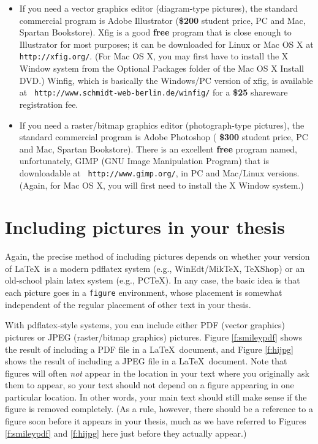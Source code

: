 \documentclass[modernstyle,12pt]{sjsuthesis}
\theoremstyle{definition}
\begin{document}
\begin{itemize}
\item If you need a vector graphics editor (diagram-type pictures),
  the standard commercial program is Adobe Illustrator ({\bf \$200\/}
  student price, PC and Mac, Spartan Bookstore).  Xfig is a good {\bf
    free\/} program that is close enough to Illustrator for most
  purposes; it can be downloaded for Linux or Mac OS X at {\tt
    http://xfig.org/}.  (For Mac OS X, you may first have to install
  the X Window system from the Optional Packages folder of the Mac OS
  X Install DVD.)  Winfig, which is basically the Windows/PC version
  of xfig, is available at {\tt
    http://www.schmidt-web-berlin.de/winfig/} for a {\bf \$25\/}
  shareware registration fee.

\item If you need a raster/bitmap graphics editor (photograph-type
  pictures), the standard commercial program is Adobe Photoshop ({\bf
    \$300\/} student price, PC and Mac, Spartan Bookstore).  There is
  an excellent {\bf free\/} program named, unfortunately, GIMP (GNU
  Image Manipulation Program) that is downloadable at {\tt
    http://www.gimp.org/}, in PC and Mac/Linux versions.  (Again, for
  Mac OS X, you will first need to install the X Window system.)
\end{itemize}



\section{Including pictures in your thesis}
\label{sect:pictures}

Again, the precise method of including pictures depends on whether
your version of \LaTeX\ is a modern pdflatex system (e.g.,
WinEdt/MikTeX, TeXShop) or an old-school plain latex system (e.g.,
PCTeX).  In any case, the basic idea is that each picture goes in a
{\tt figure\/} environment, whose placement is somewhat independent of
the regular placement of other text in your thesis.

With pdflatex-style systems, you can include either PDF (vector
graphics) pictures or JPEG (raster/bitmap graphics) pictures.  Figure
\ref{f:smileypdf} shows the result of including a PDF file in a
\LaTeX\ document, and Figure \ref{f:hijpg} shows the result of
including a JPEG file in a \LaTeX\ document.  Note that figures will
often {\it not\/} appear in the location in your text where you
originally ask them to appear, so your text should not depend on a
figure appearing in one particular location.  In other words, your
main text should still make sense if the figure is removed completely.
(As a rule, however, there should be a reference to a figure soon
before it appears in your thesis, much as we have referred to Figures
\ref{f:smileypdf} and \ref{f:hijpg} here just before they actually
appear.)
\end{document}
